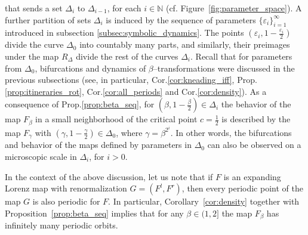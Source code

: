 \documentclass[10pt,reqno]{amsart}
\theoremstyle{plain}
\theoremstyle{assumption}
\theoremstyle{notation}
\theoremstyle{claim}
\theoremstyle{conj}
\theoremstyle{theorem}
\theoremstyle{proposition}
\theoremstyle{corollary}
\begin{document}
that sends a set $\Delta_i$ to $\Delta_{i-1}$, for each $i\in\mathbb{N}$ (cf. Figure~\ref{fig:parameter_space}). A further partition of sets $\Delta_i$ is induced by the sequence of parameters $\{\varepsilon_i\}_{i=1}^\infty$ introduced in subsection \ref{subsec:symbolic_dynamics}. The points $(\varepsilon_i,1-\frac{\varepsilon_i}{2})$ divide the curve $\Delta_0$ into countably many parts, and similarly, their preimages under the map $R_{\Delta}$ divide the rest of the curves $\Delta_i$. Recall that for parameters from $\Delta_0$, bifurcations and dynamics of $\beta$--transformations were discussed in the previous subsections (see, in particular, Cor.\ref{cor:kneading_iff}, Prop.\ref{prop:itineraries_rot}, Cor.\ref{cor:all_periods} and Cor.\ref{cor:density}). As a consequence of Prop.\ref{prop:beta_seq}, for $(\beta,1-\frac{\beta}{2})\in\Delta_i$ the behavior of the map $F_{\beta}$ in a small neighborhood of the critical point $c=\frac{1}{2}$ is described by the map $F_{\gamma}$ with $(\gamma,1-\frac{\gamma}{2})\in\Delta_0$, where $\gamma=\beta^{2^i}$. In other words, the bifurcations and behavior of the maps defined by parameters in $\Delta_0$ can also be observed on a microscopic scale in $\Delta_i$, for $i>0$.

In the context of the above discussion, let us note that if $F$ is an expanding Lorenz map with renormalization $G=(F^l,F^r)$, then every periodic point of the map $G$ is also periodic for $F$. In particular, Corollary~\ref{cor:density} together with Proposition~\ref{prop:beta_seq} implies that for any $\beta\in(1,2]$ the map $F_{\beta}$ has infinitely many periodic orbits.
\end{document}
